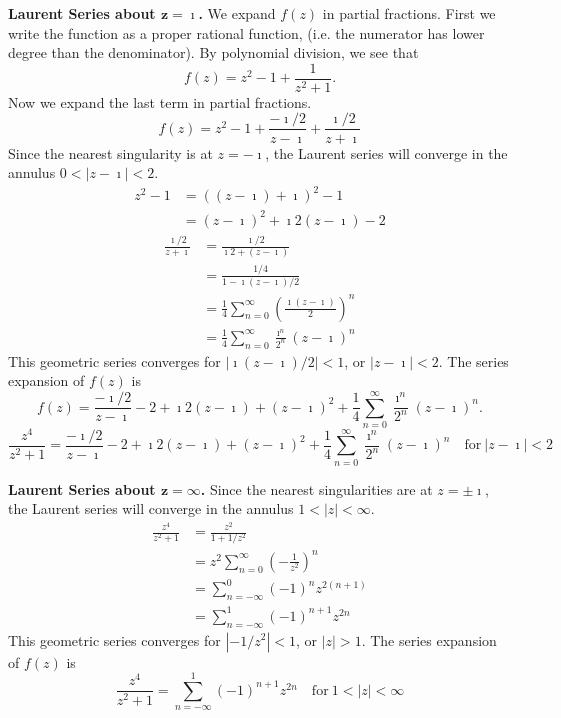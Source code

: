 {\begin{Solution}
  \textbf{Laurent Series about $\mathbf{z = \imath}$.}
  We expand $f(z)$ in partial fractions.  First we write the function as
  a proper rational function, (i.e. the numerator has lower degree than the
  denominator).  By polynomial division, we see that
  \[
  f(z) = z^2 - 1 + \frac{1}{z^2 + 1}.
  \]
  Now we expand the last term in partial fractions.
  \[
  f(z) = z^2 - 1 + \frac{- \imath / 2}{z - \imath} + \frac{\imath / 2}{z + \imath}
  \]
  Since the nearest singularity is at $z = - \imath$, the Laurent series will
  converge in the annulus $0 < |z - \imath| < 2$.
  \begin{align*}
    z^2 - 1
    &= ((z - \imath) + \imath)^2 - 1 \\
    &= (z - \imath)^2 + \imath 2 (z - \imath) - 2
  \end{align*}
  \begin{align*}
    \frac{\imath / 2}{z + \imath}
    &= \frac{\imath/2}{\imath 2 + (z - \imath)} \\
    &= \frac{1/4}{1 - \imath (z - \imath)/2} \\
    &= \frac{1}{4} \sum_{n = 0}^\infty \left( \frac{\imath (z - \imath)}{2} \right)^n \\
    &= \frac{1}{4} \sum_{n = 0}^\infty \frac{\imath^n}{2^n} (z - \imath)^n
  \end{align*}
  This geometric series converges for $|\imath (z - \imath)/2| < 1$, or $|z - \imath| < 2$.
  The series expansion of $f(z)$ is
  \[
  f(z) = \frac{- \imath / 2}{z - \imath} - 2 + \imath 2 (z - \imath) + (z - \imath)^2
  + \frac{1}{4} \sum_{n = 0}^\infty \frac{\imath^n}{2^n} (z - \imath)^n.
  \]
  \[
  \boxed{
    \frac{z^4}{z^2+1} = \frac{- \imath / 2}{z - \imath} - 2 + \imath 2 (z - \imath) + (z - \imath)^2
    + \frac{1}{4} \sum_{n = 0}^\infty \frac{\imath^n}{2^n} (z - \imath)^n \quad
    \mathrm{for}\ |z - \imath| < 2
    }
  \]

  \textbf{Laurent Series about $\mathbf{z = \infty}$.}
  Since the nearest singularities are at $z = \pm \imath$, the Laurent series will
  converge in the annulus $1 < |z| < \infty$.
  \begin{align*}
    \frac{z^4}{z^2 + 1}
    &= \frac{z^2}{1 + 1/z^2} \\
    &= z^2 \sum_{n = 0}^\infty \left( - \frac{1}{z^2} \right)^n \\
    &= \sum_{n = -\infty}^0 (-1)^n z^{2(n+1)} \\
    &= \sum_{n = -\infty}^1 (-1)^{n+1} z^{2n}
  \end{align*}
  This geometric series converges for $|-1/z^2| < 1$, or $|z| > 1$.
  The series expansion of $f(z)$ is
  \[
  \boxed{
    \frac{z^4}{z^2+1} = \sum_{n = -\infty}^1 (-1)^{n+1} z^{2n}
    \quad \mathrm{for}\ 1 < |z| < \infty
    }
  \]
\end{Solution}










}

